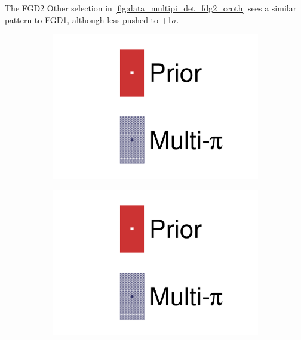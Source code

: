 The FGD2 Other selection in \autoref{fig:data_multipi_det_fdg2_ccoth} sees a similar pattern to FGD1, although less pushed to +1$\sigma$.
\begin{figure}[h]
	\centering
	\begin{subfigure}[t]{0.1\textwidth}
		\includegraphics[width=\textwidth,page=1, trim={0mm 120mm 40mm 20mm}, clip]{figures/mach3/2018/data/2018a_FixedCov_RedCov_Mpi_Data_merge_drawPar_withDet}
	\end{subfigure}
	\begin{subfigure}[t]{0.1\textwidth}
		\includegraphics[width=\textwidth,page=1, trim={0mm 20mm 40mm 120mm}, clip]{figures/mach3/2018/data/2018a_FixedCov_RedCov_Mpi_Data_merge_drawPar_withDet}
	\end{subfigure}


\end{figure}
